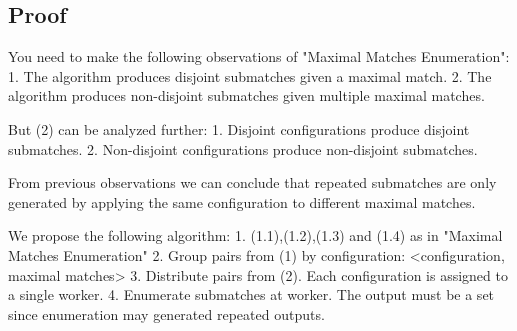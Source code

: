 \documentclass[12pt, a4paper]{article}
\begin{document}
\begin{algorithm}[H]
  \DontPrintSemicolon
  \SetAlgoNoLine

  \;
  \;
\caption{}
\label{algo:mmde}
\end{algorithm}

\subsection{Proof}
\label{subsec:proof}

You need to make the following observations of "Maximal Matches Enumeration":
1. The algorithm produces disjoint submatches given a maximal match.
2. The algorithm produces non-disjoint submatches given multiple maximal matches.

But (2) can be analyzed further:
1. Disjoint configurations produce disjoint submatches.
2. Non-disjoint configurations produce non-disjoint submatches.

From previous observations we can conclude that repeated submatches are only generated by applying the same configuration to different maximal matches.

We propose the following algorithm:
1. (1.1),(1.2),(1.3) and (1.4) as in "Maximal Matches Enumeration"
2. Group pairs from (1) by configuration: <configuration, {maximal matches}>
3. Distribute pairs from (2). Each configuration is assigned to a single worker.
4. Enumerate submatches at worker. The output must be a set since enumeration may generated repeated outputs.
\end{document}
